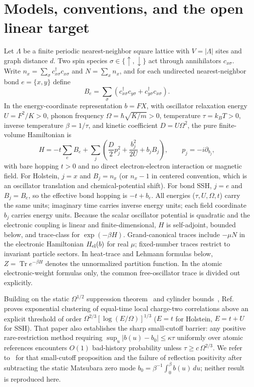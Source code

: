 \documentclass[11pt]{article}
\theoremstyle{remark}
\DeclareMathOperator{\Tr}{Tr}
\begin{document}
\section{Models, conventions, and the open linear target}

Let $\Lambda$ be a finite periodic nearest-neighbor square lattice with $V=|\Lambda|$ sites and graph distance $d$. Two spin species $\sigma\in\{\uparrow,\downarrow\}$ act through annihilators $c_{x\sigma}$. Write $n_x=\sum_\sigma c_{x\sigma}^\dagger c_{x\sigma}$ and $N=\sum_x n_x$, and for each undirected nearest-neighbor bond $e=\{x,y\}$ define
\[
 B_e=\sum_\sigma (c_{x\sigma}^\dagger c_{y\sigma}+c_{y\sigma}^\dagger c_{x\sigma}).
\]
In the energy-coordinate representation $b=FX$, with oscillator relaxation energy $U=F^2/K>0$, phonon frequency $\Omega=\hbar\sqrt{K/m}>0$, temperature $\tau=k_BT>0$, inverse temperature $\beta=1/\tau$, and kinetic coefficient $D=U\Omega^2$, the pure finite-volume Hamiltonian is
\begin{equation}\label{eq:model}
 H=-t\sum_e B_e+\sum_j\left(\frac{D}{2}p_j^2+\frac{b_j^2}{2U}+b_j B_j\right),
 \qquad p_j=-i\partial_{b_j},
\end{equation}
with bare hopping $t>0$ and no direct electron-electron interaction or magnetic field. For Holstein, $j=x$ and $B_j=n_x$ (or $n_x-1$ in centered convention, which is an oscillator translation and chemical-potential shift). For bond SSH, $j=e$ and $B_j=B_e$, so the effective bond hopping is $-t+b_e$. All energies ($\tau,U,\Omega,t$) carry the same units; imaginary time carries inverse energy units; each field coordinate $b_j$ carries energy units. Because the scalar oscillator potential is quadratic and the electronic coupling is linear and finite-dimensional, $H$ is self-adjoint, bounded below, and trace-class for $\exp(-\beta H)$. Grand-canonical traces include $-\mu N$ in the electronic Hamiltonian $H_{\rm el}(b)$ for real $\mu$; fixed-number traces restrict to invariant particle sectors. In heat-trace and Lehmann formulas below, $Z=\Tr e^{-\beta H}$ denotes the unnormalized partition function. In the atomic electronic-weight formulas only, the common free-oscillator trace is divided out explicitly.

Building on the static $\Omega^{1/2}$ suppression theorem~\cite{slow} and cylinder bounds~\cite{cylinders}, Ref.~\cite{linear4} proves exponential clustering of equal-time local charge-two correlations above an explicit threshold of order $\Omega^{2/3}[\log(E/\Omega)]^{1/3}$ ($E=t$ for Holstein, $E=t+U$ for SSH). That paper also establishes the sharp small-cutoff barrier: any positive rare-restriction method requiring $\sup_u |b(u)-b_0|\le\kappa\tau$ uniformly over atomic references encounters $O(1)$ bad-history probability unless $\tau\ge c\,\Omega^{2/3}$. We refer to~\cite{linear4} for that small-cutoff proposition and the failure of reflection positivity after subtracting the static Matsubara zero mode $b_0=\beta^{-1}\int_0^\beta b(u)\,du$; neither result is reproduced here.
\end{document}

